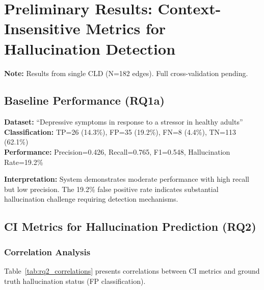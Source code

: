 \chapter{Preliminary Results: Context-Insensitive Metrics for Hallucination Detection}
\label{ch:preliminary_rq2}

\begin{tcolorbox}[colback=yellow!10!white,colframe=orange!75!black,title=Preliminary Results]
\textbf{Note:} Results from single CLD (N=182 edges). Full cross-validation pending.
\end{tcolorbox}

\section{Baseline Performance (RQ1a)}

\textbf{Dataset:} ``Depressive symptoms in response to a stressor in healthy adults'' \\
\textbf{Classification:} TP=26 (14.3\%), FP=35 (19.2\%), FN=8 (4.4\%), TN=113 (62.1\%) \\
\textbf{Performance:} Precision=0.426, Recall=0.765, F1=0.548, Hallucination Rate=19.2\%

\textbf{Interpretation:} System demonstrates moderate performance with high recall but low precision. The 19.2\% false positive rate indicates substantial hallucination challenge requiring detection mechanisms.

\section{CI Metrics for Hallucination Prediction (RQ2)}

\subsection{Correlation Analysis}

Table~\ref{tab:rq2_correlations} presents correlations between CI metrics and ground truth hallucination status (FP classification).

